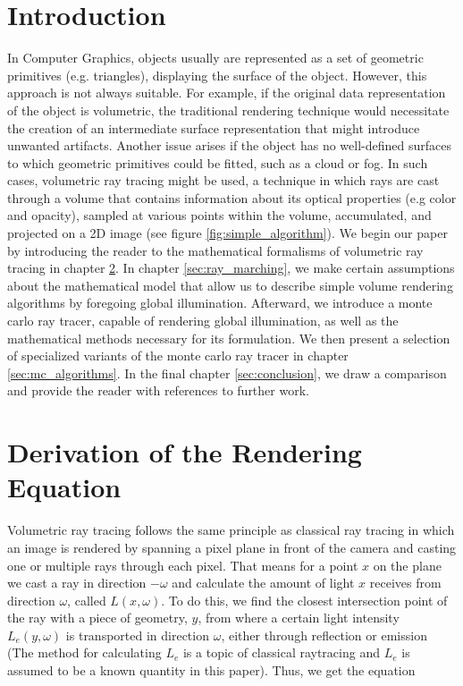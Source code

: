 




\section{Introduction}
In Computer Graphics, objects usually are represented as a set of geometric primitives \cite{KOBBELT2004801} (e.g. triangles), displaying the surface of the object. However, this approach is not always suitable. For example, if the original data representation of the object is volumetric, the traditional rendering technique would necessitate the creation of an intermediate surface representation that might introduce unwanted artifacts\cite{511}. Another issue arises if the object has no well-defined surfaces to which geometric primitives could be fitted, such as a cloud or fog\cite{10.1145/964965.808594}. In such cases, volumetric ray tracing might be used, a technique in which rays are cast through a volume that contains information about its optical properties (e.g color and opacity), sampled at various points within the volume, accumulated, and projected on a 2D image (see figure \ref{fig:simple_algorithm})\cite{511}.
We begin our paper by introducing the reader to the mathematical formalisms of volumetric ray tracing in chapter \ref{sec:math}. In chapter \ref{sec:ray_marching}, we make certain assumptions about the mathematical model that allow us to describe simple volume rendering algorithms by foregoing global illumination. Afterward, we introduce a monte carlo ray tracer, capable of rendering global illumination, as well as the mathematical methods necessary for its formulation. We then present a selection of specialized variants of the monte carlo ray tracer in chapter \ref{sec:mc_algorithms}. In the final chapter \ref{sec:conclusion}, we draw a comparison and provide the reader with references to further work. 




\section{Derivation of the Rendering Equation}
\label{sec:math}
Volumetric ray tracing follows the same principle as classical ray tracing in which an image is rendered by spanning a pixel plane in front of the camera and casting one or multiple rays through each pixel\cite{10.5555/94788}.
That means for a point ${x}$ on the plane we cast a ray in direction $-\omega$ and calculate the amount of light ${x}$ receives from direction $\omega$, called $L({x},\omega )$.
To do this, we find the closest intersection point of the ray with a piece of geometry,  ${y}$,  from where a certain light intensity $L_e({y},\omega )$ is transported in direction $\omega$, either through reflection or emission (The method for calculating $L_e$ is a topic of classical raytracing\cite{10.5555/94788} and $L_e$ is assumed to be a known quantity in this paper).
Thus, we get the equation 

